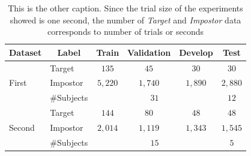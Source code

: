 \documentclass[a4paper,12pt]{article}
\begin{document}
\begin{table}[H]
\centering
\caption[This is the caption]{ \footnotesize This is the other caption. Since the trial size of the experiments showed is one second, the number of \textit{Target} and \textit{Impostor} data corresponds to number of trials or seconds}
\label{tab:data_partition}
\footnotesize{
\begin{tabular}{@{}llcccc@{}}
\toprule
\textbf{Dataset}         & \multicolumn{1}{c}{\textbf{Label}} & \textbf{Train} & \textbf{Validation} & \textbf{Develop} & \textbf{Test} \\ \midrule
\midrule
\multirow{3}{*}{First} & Target   & $135$ & $45$  & $30$  & $30$  \\
                         & Impostor & $5,220$    & $1,740$ & $1,890$   & $2,880$    \\
\cmidrule(lr){3-5} \cmidrule(l){6-6}
                         & \#Subjects          & \multicolumn{3}{c}{$31$} & $12$ \\
\midrule
\multirow{3}{*}{Second}  & Target   & $144$ & $80$  & $48$  & $48$  \\
                         & Impostor & $2,014$    & $1,119$    & $1,343$    & $1,545$ \\
\cmidrule(lr){3-5} \cmidrule(l){6-6}
                         & \#Subjects   & \multicolumn{3}{c}{$15$} & $5$ \\ 
\bottomrule
\end{tabular}
}
\end{table}
\end{document}
